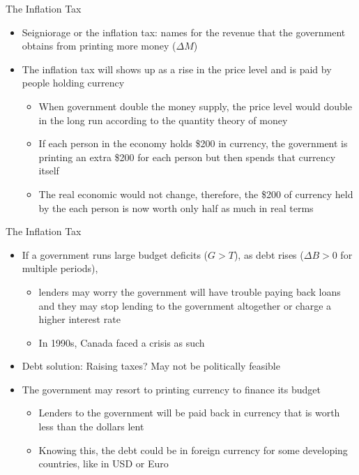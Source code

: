 \documentclass[aspectratio=1610]{beamer}
\begin{document}
\begin{frame}[wide]{The Inflation Tax}
	\begin{itemize}
		\item Seigniorage or the inflation tax: names for the revenue that the government obtains from printing more money ($\Delta M$)
		\item The inflation tax will shows up as a rise in the price level and is paid by people holding currency
		\begin{itemize}
			\item When government double the money supply, the price level would double in the long run according to the quantity theory of money
			\item If each person in the economy holds \$200 in currency, the government is printing an extra \$200 for each person but then spends that currency itself
			\item The real economic would not change, therefore, the \$200 of currency held by the each person is now worth only half as much in real terms
		\end{itemize}
		
	\end{itemize}
\end{frame}

\begin{frame}[wide]{The Inflation Tax}
	\begin{itemize}
		\item If a government runs large budget deficits ($G>T$), as debt rises ($\Delta B >0$ for multiple periods),
		\begin{itemize}
			\item lenders may worry the government will have trouble paying back loans and they may stop lending to the government altogether or charge a higher interest rate
			\item In 1990s, Canada faced a crisis as such
		\end{itemize}
		\item Debt solution: Raising taxes?	May not be politically feasible
		\item The government may resort to printing currency to finance its budget
		\begin{itemize}
			\item Lenders to the government will be paid back in currency that is worth less than the dollars lent
			\item Knowing this, the debt could be in foreign currency for some developing countries, like in USD or Euro
		\end{itemize}		
	\end{itemize}
\end{frame}
\end{document}
